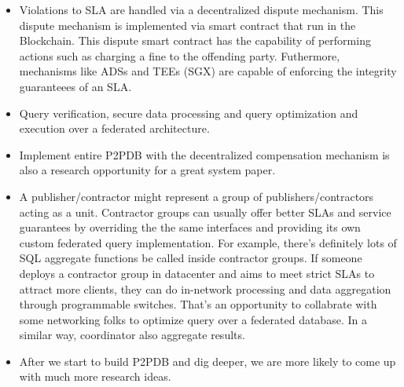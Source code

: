 \documentclass[12pt]{article}
\begin{document}
\begin{itemize}
\item  Violations to SLA are handled via a decentralized dispute mechanism. This dispute mechanism is implemented via smart contract that run in the Blockchain. This dispute smart contract has the capability of performing actions such as charging a fine to the offending party. Futhermore, mechanisms like ADSs and TEEs (SGX) are capable of enforcing the integrity guaranteees of an SLA.
\item Query verification, secure data processing and query optimization and execution over a federated architecture.
\item Implement entire P2PDB with the decentralized compensation mechanism is also a research opportunity for a great system paper.
\item A publisher/contractor might represent a group of publishers/contractors acting as a unit. Contractor groups can usually offer better SLAs and service guarantees by overriding the the same interfaces and providing its own custom federated query implementation. For example, there's definitely lots of SQL aggregate functions be called inside contractor groups. If someone deploys a contractor group in datacenter and aims to meet strict SLAs to attract more clients, they can do in-network processing and data aggregation through programmable switches. That's an opportunity to collabrate with some networking folks to optimize query over a federated database. In a similar way, coordinator also aggregate results.

\item After we start to build P2PDB and dig deeper, we are more likely to come up with much more research ideas. 

\end{itemize}

	
\end{document}
